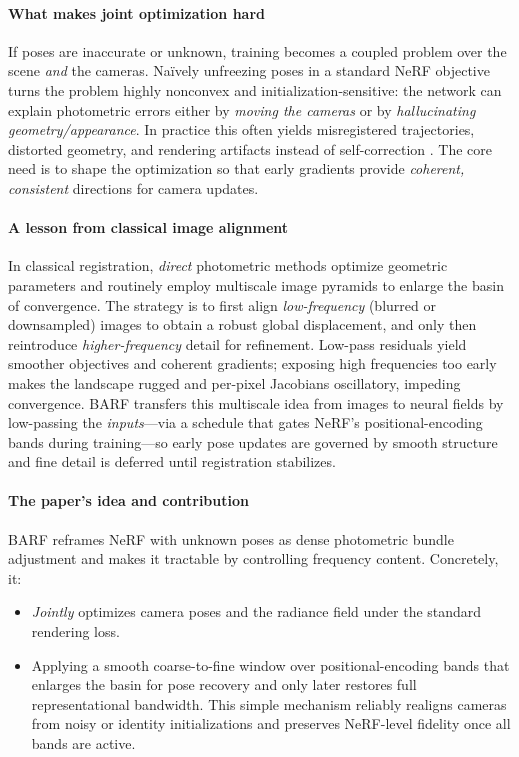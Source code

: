 \begin{enrichment}
\begin{enrichment}
        \paragraph{What makes joint optimization hard}
        If poses are inaccurate or unknown, training becomes a coupled problem over the scene \emph{and} the cameras. Na\"ively unfreezing poses in a standard NeRF objective turns the problem highly nonconvex and initialization-sensitive: the network can explain photometric errors either by \emph{moving the cameras} or by \emph{hallucinating geometry/appearance}. In practice this often yields misregistered trajectories, distorted geometry, and rendering artifacts instead of self-correction \cite{lin2021_barf}. The core need is to shape the optimization so that early gradients provide \emph{coherent, consistent} directions for camera updates.
        
        \paragraph{A lesson from classical image alignment}
        In classical registration, \emph{direct} photometric methods optimize geometric parameters and routinely employ multiscale image pyramids to enlarge the basin of convergence. The strategy is to first align \emph{low-frequency} (blurred or downsampled) images to obtain a robust global displacement, and only then reintroduce \emph{higher-frequency} detail for refinement. Low-pass residuals yield smoother objectives and coherent gradients; exposing high frequencies too early makes the landscape rugged and per-pixel Jacobians oscillatory, impeding convergence. BARF transfers this multiscale idea from images to neural fields by low-passing the \emph{inputs}—via a schedule that gates NeRF’s positional-encoding bands during training—so early pose updates are governed by smooth structure and fine detail is deferred until registration stabilizes.
        
        \newpage
        
        \paragraph{The paper's idea and contribution}
        BARF reframes NeRF with unknown poses as dense photometric bundle adjustment and makes it tractable by controlling frequency content. Concretely, it:
        \begin{itemize}
            \item \emph{Jointly} optimizes camera poses and the radiance field under the standard rendering loss. 
            \item Applying a smooth coarse-to-fine window over positional-encoding bands that enlarges the basin for pose recovery and only later restores full representational bandwidth. This simple mechanism reliably realigns cameras from noisy or identity initializations and preserves NeRF-level fidelity once all bands are active. 
        \end{itemize}
        

\end{enrichment}
\end{enrichment}
